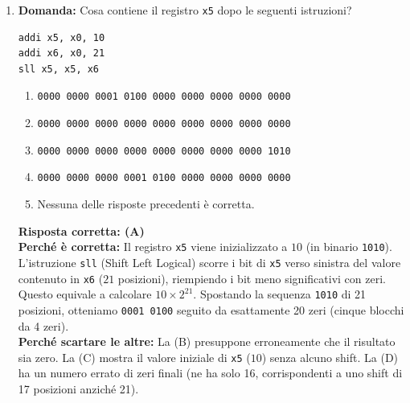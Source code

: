\documentclass[12pt, a4paper]{article}
\begin{document}
\begin{enumerate}
    \item \textbf{Domanda:} Cosa contiene il registro \texttt{x5} dopo le seguenti istruzioni?
\begin{verbatim}
addi x5, x0, 10
addi x6, x0, 21
sll x5, x5, x6
\end{verbatim}
    \begin{enumerate}[label=(\Alph*)]
        \item \texttt{0000 0000 0001 0100 0000 0000 0000 0000 0000}
        \item \texttt{0000 0000 0000 0000 0000 0000 0000 0000 0000}
        \item \texttt{0000 0000 0000 0000 0000 0000 0000 0000 1010}
        \item \texttt{0000 0000 0000 0001 0100 0000 0000 0000 0000}
        \item Nessuna delle risposte precedenti è corretta.
    \end{enumerate}
    \textbf{Risposta corretta: (A)} \\
    \textbf{Perché è corretta:} Il registro \texttt{x5} viene inizializzato a $10$ (in binario \texttt{1010}). L'istruzione \texttt{sll} (Shift Left Logical) scorre i bit di \texttt{x5} verso sinistra del valore contenuto in \texttt{x6} ($21$ posizioni), riempiendo i bit meno significativi con zeri. Questo equivale a calcolare $10 \times 2^{21}$. Spostando la sequenza \texttt{1010} di 21 posizioni, otteniamo \texttt{0001 0100} seguito da esattamente 20 zeri (cinque blocchi da 4 zeri). \\
    \textbf{Perché scartare le altre:} La (B) presuppone erroneamente che il risultato sia zero. La (C) mostra il valore iniziale di \texttt{x5} ($10$) senza alcuno shift. La (D) ha un numero errato di zeri finali (ne ha solo 16, corrispondenti a uno shift di 17 posizioni anziché 21).


\end{enumerate}
\end{document}
